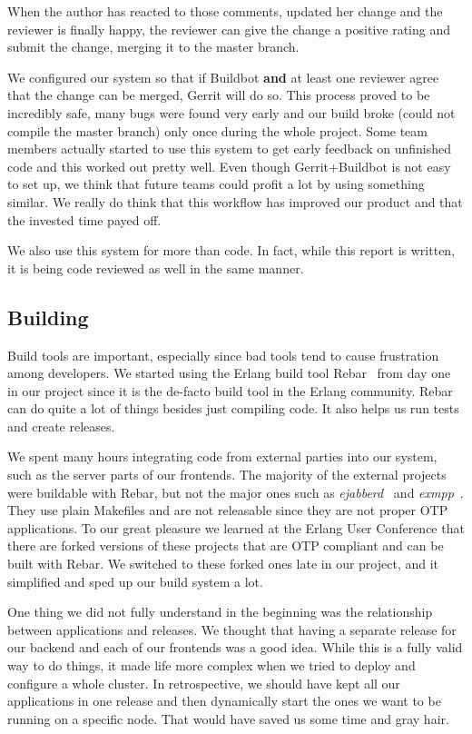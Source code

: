 \documentclass[11pt,a4paper]{report}
\begin{document}
When the author has reacted to those comments, updated her change and the
reviewer is finally happy, the reviewer can give the change a positive rating
and submit the change, merging it to the master branch.

We configured our system so that if Buildbot {\bf and} at least one reviewer
agree that the change can be merged, Gerrit will do so. This process proved to
be incredibly safe, many bugs were found very early and our build broke (could
not compile the master branch) only once during the whole project. Some team
members actually started to use this system to get early feedback on unfinished
code and this worked out pretty well. Even though Gerrit+Buildbot is not easy to
set up, we think that future teams could profit a lot by using something
similar. We really do think that this workflow has improved our product and that
the invested time payed off.

We also use this system for more than code. In fact, while this report is
written, it is being code reviewed as well in the same manner.
\subsection{Building}
Build tools are important, especially since bad tools tend to cause frustration
among developers. We started using the Erlang build tool Rebar~\cite{rebar} from day one in
our project since it is the de-facto build tool in the Erlang community. Rebar
can do quite a lot of things besides just compiling code. It also helps us run
tests and create releases.

We spent many hours integrating code from external parties into our system, such
as the server parts of our frontends. The majority of the external projects were
buildable with Rebar, but not the major ones such as \emph{ejabberd}~\cite{ejabberd_im} and \emph{exmpp}~\cite{exmpp_api}. They
use plain Makefiles and are not releasable since they are not proper OTP
applications. To our great pleasure we learned at the Erlang User Conference
that there are forked versions of these projects that are OTP compliant and can
be built with Rebar. We switched to these forked ones late in our project, and
it simplified and sped up our build system a lot.

One thing we did not fully understand in the beginning was the relationship
between applications and releases. We thought that having a separate release for
our backend and each of our frontends was a good idea. While this is a fully
valid way to do things, it made life more complex when we tried to deploy and
configure a whole cluster. In retrospective, we should have kept all our
applications in one release and then dynamically start the ones we want to be
running on a specific node. That would have saved us some time and gray hair.
\end{document}
